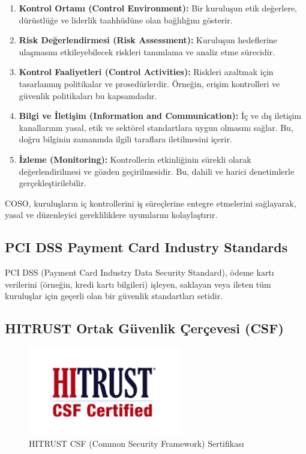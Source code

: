 \begin{enumerate}
    \item \textbf{Kontrol Ortamı (Control Environment):} Bir kuruluşun etik değerlere, dürüstlüğe ve liderlik taahhüdüne olan bağlılığını gösterir.
    \item \textbf{Risk Değerlendirmesi (Risk Assessment):} Kuruluşun hedeflerine ulaşmasını etkileyebilecek riskleri tanımlama ve analiz etme sürecidir.
    \item \textbf{Kontrol Faaliyetleri (Control Activities):} Riskleri azaltmak için tasarlanmış politikalar ve prosedürlerdir. Örneğin, erişim kontrolleri ve güvenlik politikaları bu kapsamdadır.
    \item \textbf{Bilgi ve İletişim (Information and Communication):} İç ve dış iletişim kanallarının yasal, etik ve sektörel standartlara uygun olmasını sağlar. Bu, doğru bilginin zamanında ilgili taraflara iletilmesini içerir.
    \item \textbf{İzleme (Monitoring):} Kontrollerin etkinliğinin sürekli olarak değerlendirilmesi ve gözden geçirilmesidir. Bu, dahili ve harici denetimlerle gerçekleştirilebilir.
\end{enumerate}

COSO, kuruluşların iç kontrollerini iş süreçlerine entegre etmelerini sağlayarak, yasal ve düzenleyici gerekliliklere uyumlarını kolaylaştırır.

\subsection{PCI DSS Payment Card Industry Standards}

PCI DSS (Payment Card Industry Data Security Standard), ödeme kartı verilerini (örneğin, kredi kartı bilgileri) işleyen, saklayan veya ileten tüm kuruluşlar için geçerli olan bir güvenlik standartları setidir.



\subsection{HITRUST Ortak Güvenlik Çerçevesi (CSF)}

\begin{figure}[H]
    \centering
    \includegraphics[width=0.6\textwidth]{img/HITRUSTCSFCertifiedLogo.png}
    \caption{HITRUST CSF (Common Security Framework) Sertifikası}
    \label{fig:hitrust-csf}
\end{figure}

